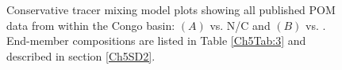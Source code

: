 \begin{figure}[p]
	\caption[Conservative tracer mixing model]{Conservative tracer mixing model plots showing all published POM data from within the Congo basin: $(A)$  vs. N/C and $(B)$  vs. . End-member compositions are listed in Table \ref{Ch5Tab:3} and described in section \ref{Ch5SD2}.}
	\label{Ch5Fig:5} 
\end{figure}

